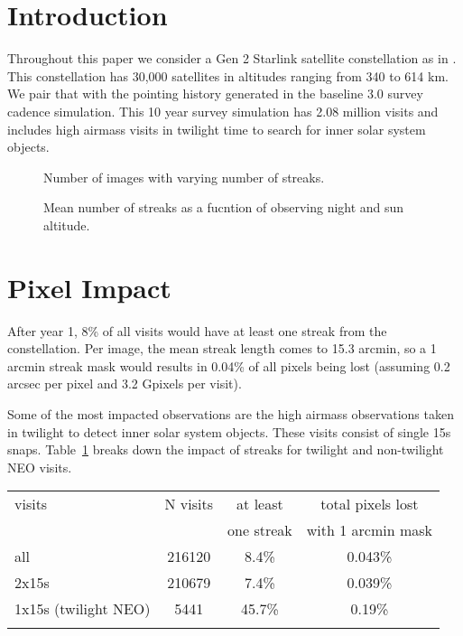 \section{Introduction}

Throughout this paper we consider a Gen 2 Starlink satellite constellation as in \citet{Hu2022}. This constellation has 30,000 satellites in altitudes ranging from 340 to 614 km. We pair that with the pointing history generated in the baseline 3.0 survey cadence simulation. This 10 year survey simulation has 2.08 million visits and includes high airmass visits in twilight time to search for inner solar system objects.


\begin{figure}
\caption{Number of images with varying number of streaks. \label{fig:streak_hist_1}}
\end{figure}



\begin{figure}
\caption{Mean number of streaks as a fucntion of observing night and sun altitude. \label{fig:streak_hist_2}}
\end{figure}

\section{Pixel Impact}

After year 1, 8\% of all visits would have at least one streak from the constellation. Per image, the mean streak length comes to 15.3 arcmin, so a 1 arcmin streak mask would results in 0.04\% of all pixels being lost (assuming 0.2 arcsec per pixel and 3.2 Gpixels per visit).

Some of the most impacted observations are the high airmass observations taken in twilight to detect inner solar system objects. These visits consist of single 15s snaps. Table~\ref{table:pixel} breaks down the impact of streaks for twilight and non-twilight NEO visits. 

\begin{table}
\begin{tabular}{ l  c  c c}
  visits & N visits & at least  & total pixels lost \\
  & & one streak & with 1 arcmin mask \\
  \hline			
  all & 216120 & 8.4\%  & 0.043\% \\
  2x15s & 210679 & 7.4\% &  0.039\% \\
  1x15s (twilight NEO)  & 5441 & 45.7\% & 0.19\% \\
  \hline  
  \label{table:pixel}
\end{tabular}
\end{table}


